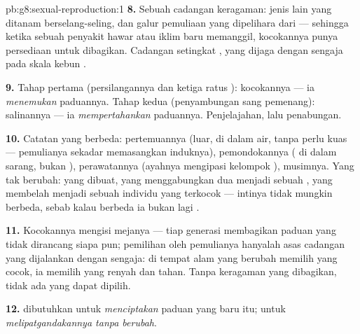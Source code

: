 \begin{solution}{pb:g8:sexual-reproduction:1}
\textbf{8.} Sebuah cadangan keragaman: jenis lain yang ditanam
berselang-seling, dan galur pemuliaan yang dipelihara dari  ---
sehingga ketika sebuah penyakit hawar atau iklim baru memanggil,
kocokannya punya persediaan untuk dibagikan. Cadangan setingkat
, yang dijaga dengan sengaja pada skala kebun .

\textbf{9.} Tahap pertama (persilangannya dan ketiga ratus
): kocokannya --- ia \emph{menemukan} paduannya. Tahap
kedua (penyambungan sang pemenang): salinannya --- ia
\emph{mempertahankan} paduannya. Penjelajahan, lalu penabungan.

\textbf{10.} Catatan yang berbeda: pertemuannya (luar, di dalam air,
tanpa perlu kuas --- pemulianya sekadar memasangkan induknya),
pemondokannya ( di dalam sarang, bukan ), perawatannya
(ayahnya mengipasi kelompok ), musimnya. Yang tak berubah:
 yang dibuat,  yang menggabungkan dua menjadi sebuah
,  yang membelah menjadi sebuah individu yang terkocok ---
intinya tidak mungkin berbeda, sebab kalau berbeda ia bukan lagi
.

\textbf{11.} Kocokannya mengisi mejanya --- tiap generasi membagikan
paduan yang tidak dirancang siapa pun; pemilihan oleh pemulianya
hanyalah asas cadangan yang dijalankan dengan sengaja: di tempat
 alam yang berubah memilih yang cocok, ia memilih yang renyah
dan tahan. Tanpa keragaman yang dibagikan, tidak ada yang dapat
dipilih.

\textbf{12.}  dibutuhkan untuk \emph{menciptakan}
paduan yang baru itu;  untuk
\emph{melipatgandakannya tanpa berubah}.
\end{solution}
